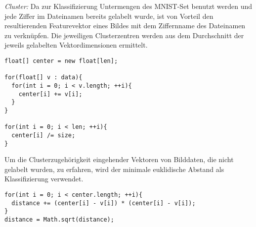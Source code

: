 \textit{Cluster:}
Da zur Klassifizierung Untermengen des MNIST-Set benutzt werden und jede Ziffer im Dateinamen bereits gelabelt wurde, ist von Vorteil den resultierenden Featurevektor eines Bildes mit dem Ziffernname des Dateinamen zu verknüpfen.
Die jeweiligen Clusterzentren werden aus dem Durchschnitt der jeweils gelabelten Vektordimensionen ermittelt.
\begin{lstlisting}
float[] center = new float[len];
        
for(float[] v : data){
  for(int i = 0; i < v.length; ++i){
    center[i] += v[i];
  }
}
        
for(int i = 0; i < len; ++i){
  center[i] /= size;
}
\end{lstlisting}
Um die Clusterzugehörigkeit eingehender Vektoren von Bilddaten, die nicht gelabelt wurden, zu erfahren, wird der minimale euklidische Abstand als Klassifizierung verwendet.
\begin{lstlisting}
for(int i = 0; i < center.length; ++i){
  distance += (center[i] - v[i]) * (center[i] - v[i]);
}
distance = Math.sqrt(distance);
\end{lstlisting}